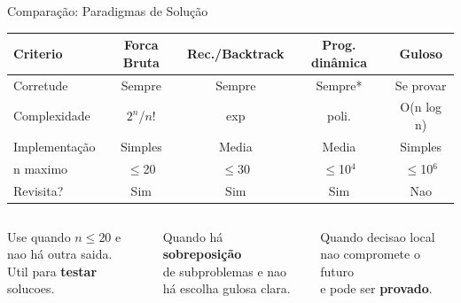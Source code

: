 \documentclass[aspectratio=169,10pt]{beamer}
\begin{document}
\begin{frame}{Comparação: Paradigmas de Solução}
  \begin{tcolorbox}[caixaAzul,title={Quando usar cada paradigma?}]
    \centering\footnotesize
    \begin{tabular}{lcccc}
      \toprule
      \textbf{Criterio} & \textbf{Forca Bruta} & \textbf{Rec./Backtrack} & \textbf{Prog. dinâmica} & \textbf{Guloso}\\
      \midrule
      Corretude    & Sempre & Sempre & Sempre* & Se provar\\
      Complexidade & $2^n$/$n!$ & exp & poli. & O(n log n)\\
      Implementação& Simples & Media & Media & Simples\\
      n maximo     & $\leq$20 & $\leq$30 & $\leq$10$^4$ & $\leq$10$^6$\\
      Revisita?    & Sim & Sim & Sim & Nao\\
      \bottomrule
    \end{tabular}
  \end{tcolorbox}
  \vspace{0.12cm}
  \begin{columns}[t]
      \begin{tcolorbox}[caixaVermelho,title={Forca Bruta}]
        \footnotesize
        Use quando $n \leq 20$ e\\
        nao há outra saida.\\
        Util para \textbf{testar} solucoes.
      \end{tcolorbox}
      \begin{tcolorbox}[caixaAzul,title={Programação dinâmica}]
        \footnotesize
        Quando há \textbf{sobreposição}\\
        de subproblemas e nao\\
        há escolha gulosa clara.
      \end{tcolorbox}
      \begin{tcolorbox}[caixaDourada,title={Guloso}]
        \footnotesize
        Quando decisao local\\
        nao compromete o futuro\\
        e pode ser \textbf{provado}.
      \end{tcolorbox}
  \end{columns}
\end{frame}
\end{document}

